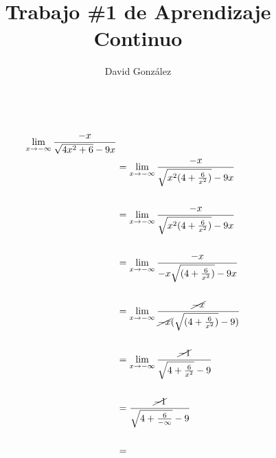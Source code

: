 \documentclass{article}
\title{Trabajo \#1 de Aprendizaje Continuo }
\author{David González}
\theoremstyle{mytheoremstyle}
\theoremstyle{mytheoremstyle}
\theoremstyle{myproblemstyle}
\begin{document}
\maketitle

\begin{equation*} \label{eq1}
    \begin{split}
    \\\lim_{x\to - \infty } \frac{-x}{\sqrt{4x^2+6}-9x}\\
        &=\lim_{x\to - \infty } \frac{-x}{\sqrt{x^2(4+\frac{6}{x^2})}-9x}\\\\
        &=\lim_{x\to - \infty } \frac{-x}{\sqrt{x^2(4+\frac{6}{x^2})}-9x}\\\\
        &=\lim_{x\to - \infty } \frac{-x}{-x\sqrt{(4+\frac{6}{x^2})}-9x}\\\\
        &=\lim_{x\to - \infty } \frac{\cancel{-x}}{\cancel{-x}(\sqrt{(4+\frac{6}{x^2})}-9)}\\\\
        &=\lim_{x\to - \infty } \frac{\cancel{-1}}{\sqrt{4+\frac{6}{x^2}}-9}\\\\
        &=\frac{\cancel{-1}}{\sqrt{4+\frac{6}{-\infty}}-9}\\\\
        &=
    \end{split}
\end{equation*}
\end{document}
